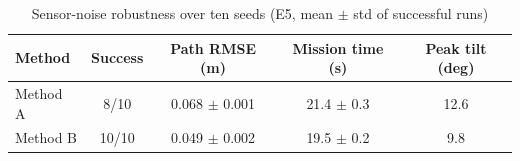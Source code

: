 \begin{table}[h]
\centering
\caption{Sensor-noise robustness over ten seeds (E5, mean $\pm$ std of successful runs)}
\label{tab:e5}
\begin{tabular}{|l|c|c|c|c|}
\hline
\textbf{Method} & \textbf{Success} & \textbf{Path RMSE (m)} & \textbf{Mission time (s)} & \textbf{Peak tilt (deg)} \\ \hline
Method A & 8/10 & 0.068 $\pm$ 0.001 & 21.4 $\pm$ 0.3 & 12.6 \\ \hline
Method B & 10/10 & 0.049 $\pm$ 0.002 & 19.5 $\pm$ 0.2 & 9.8 \\ \hline
\end{tabular}
\end{table}
